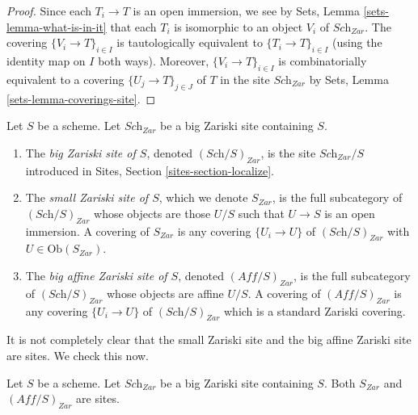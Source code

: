 \begin{proof}
Since each $T_i \to T$ is an open immersion, we see by
Sets, Lemma \ref{sets-lemma-what-is-in-it}
that each $T_i$ is isomorphic to an object $V_i$ of $\textit{Sch}_{Zar}$.
The covering $\{V_i \to T\}_{i \in I}$ is tautologically equivalent
to $\{T_i \to T\}_{i \in I}$ (using the identity map on $I$ both ways).
Moreover, $\{V_i \to T\}_{i \in I}$ is combinatorially equivalent to a
covering $\{U_j \to T\}_{j \in J}$ of $T$ in the site $\textit{Sch}_{Zar}$ by
Sets, Lemma \ref{sets-lemma-coverings-site}.
\end{proof}

\begin{definition}
\label{definition-big-small-Zariski}
Let $S$ be a scheme. Let $\textit{Sch}_{Zar}$ be a big Zariski
site containing $S$.
\begin{enumerate}
\item The {\it big Zariski site of $S$}, denoted
$(\textit{Sch}/S)_{Zar}$, is the site $\textit{Sch}_{Zar}/S$
introduced in Sites, Section \ref{sites-section-localize}.
\item The {\it small Zariski site of $S$}, which we denote
$S_{Zar}$, is the full subcategory of $(\textit{Sch}/S)_{Zar}$
whose objects are those $U/S$ such that $U \to S$ is an open immersion.
A covering of $S_{Zar}$ is any covering $\{U_i \to U\}$ of
$(\textit{Sch}/S)_{Zar}$ with $U \in \text{Ob}(S_{Zar})$.
\item The {\it big affine Zariski site of $S$}, denoted
$(\textit{Aff}/S)_{Zar}$, is the full subcategory of
$(\textit{Sch}/S)_{Zar}$ whose objects are affine $U/S$.
A covering of $(\textit{Aff}/S)_{Zar}$ is any covering
$\{U_i \to U\}$ of $(\textit{Sch}/S)_{Zar}$ which is a
standard Zariski covering.
\end{enumerate}
\end{definition}

\noindent
It is not completely clear that the small Zariski site and
the big affine Zariski site are sites. We check this now.

\begin{lemma}
\label{lemma-verify-site-Zariski}
Let $S$ be a scheme. Let $\textit{Sch}_{Zar}$ be a big Zariski
site containing $S$.
Both $S_{Zar}$ and $(\textit{Aff}/S)_{Zar}$ are sites.
\end{lemma}

